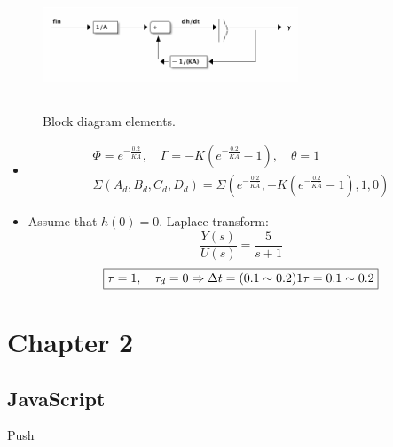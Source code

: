 \documentclass[11pt]{article}
\begin{document}
\begin{figure}[!htpb]
\centering
\includegraphics[width=3in,height=1.5in]{hello.png}
{\caption{Block diagram elements.}}
\end{figure}

\begin{itemize}
\item \[\begin{array}{c}
        \Phi = e^{-\frac{0.2}{K\overline{A}}}, \quad \Gamma = -K\left(e^{-\frac{0.2}{K\overline{A}}} - 1\right), \quad \theta = 1 \\[0.5cm]
        \Sigma(A_{d},B_{d},C_{d},D_{d}) = \Sigma\left( e^{-\frac{0.2}{K\overline{A}}}, -K\left(e^{-\frac{0.2}{K\overline{A}}} - 1\right), 1, 0\right)
        \end{array}\]
\item Assume that \(h(0) = 0\). Laplace transform:
\[ \frac{Y(s)}{U(s)} = \frac{5}{s+1}\]
\[\boxed{ \nonumber  \tau = 1, \quad \tau_{d} = 0\Rightarrow \Delta t = (0.1\sim0.2)1\tau = 0.1\sim 0.2}\]
\end{itemize}

\section{Chapter 2}
\label{sec-2}
\subsection{JavaScript}
\label{sec-2-1}
\begin{Form} %
Push 
\end{Form}
\end{document}
